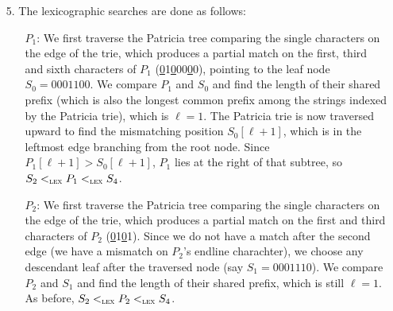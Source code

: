 \begin{itemize}
  \item[5.] The lexicographic searches are done as follows:
  \begin{itemize}

    \item[$P_1$:] We first traverse the Patricia tree comparing the single
    characters on the edge of the trie, which produces a partial match on the
    first, third and sixth characters of $P_1$
    (\underline{0}1\underline{0}00\underline{0}0), pointing to the leaf node
    $S_0 = 0001100$. We compare $P_1$ and $S_0$ and find the length of their
    shared prefix (which is also the longest common prefix among the strings
    indexed by the Patricia trie), which is $\ell = 1$. The Patricia trie is now
    traversed upward to find the mismatching position $S_0[\ell + 1]$, which is
    in the leftmost edge branching from the root node. Since $P_1[\ell + 1] >
    S_0[\ell + 1]$, $P_1$ lies at the right of that subtree, so $S_2
    <_{\text{\sc lex}} P_1 <_{\text{\sc lex}} S_4$.

    \item[$P_2$:] We first traverse the Patricia tree comparing the single
    characters on the edge of the trie, which produces a partial match on the
    first and third characters of $P_2$ (\underline{0}1\underline{0}1). Since we
    do not have a match after the second edge (we have a mismatch on $P_2$'s
    endline charachter), we choose any descendant leaf after the traversed node
    (say $S_1 = 0001110$). We compare $P_2$ and $S_1$ and find the length of
    their shared prefix, which is still $\ell = 1$. As before, $S_2 <_{\text{\sc
    lex}} P_2 <_{\text{\sc lex}} S_4$.

  \end{itemize}
\end{itemize}
